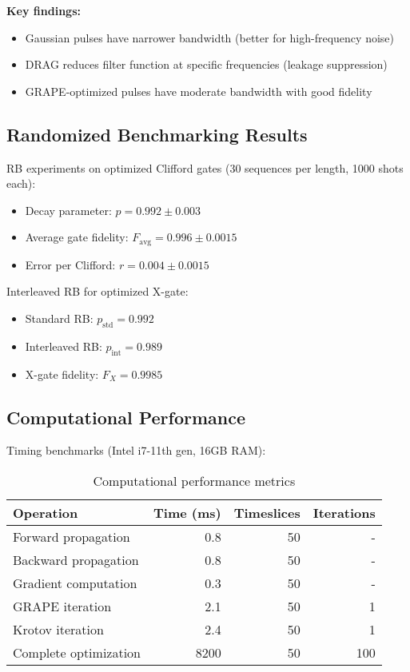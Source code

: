\documentclass[11pt,a4paper]{article}
\theoremstyle{definition}
\theoremstyle{remark}
\begin{document}
\textbf{Key findings:}
\begin{itemize}
    \item Gaussian pulses have narrower bandwidth (better for high-frequency noise)
    \item DRAG reduces filter function at specific frequencies (leakage suppression)
    \item GRAPE-optimized pulses have moderate bandwidth with good fidelity
\end{itemize}

\subsection{Randomized Benchmarking Results}

RB experiments on optimized Clifford gates (30 sequences per length, 1000 shots each):

\begin{itemize}
    \item Decay parameter: $p = 0.992 \pm 0.003$
    \item Average gate fidelity: $F_{\text{avg}} = 0.996 \pm 0.0015$
    \item Error per Clifford: $r = 0.004 \pm 0.0015$
\end{itemize}

Interleaved RB for optimized X-gate:
\begin{itemize}
    \item Standard RB: $p_{\text{std}} = 0.992$
    \item Interleaved RB: $p_{\text{int}} = 0.989$
    \item X-gate fidelity: $F_X = 0.9985$
\end{itemize}

\subsection{Computational Performance}

Timing benchmarks (Intel i7-11th gen, 16GB RAM):

\begin{table}[h]
\centering
\begin{tabular}{lrrr}
\toprule
\textbf{Operation} & \textbf{Time (ms)} & \textbf{Timeslices} & \textbf{Iterations} \\
\midrule
Forward propagation & 0.8 & 50 & - \\
Backward propagation & 0.8 & 50 & - \\
Gradient computation & 0.3 & 50 & - \\
GRAPE iteration & 2.1 & 50 & 1 \\
Krotov iteration & 2.4 & 50 & 1 \\
Complete optimization & 8200 & 50 & 100 \\
\bottomrule
\end{tabular}
\caption{Computational performance metrics}
\end{table}
\end{document}
